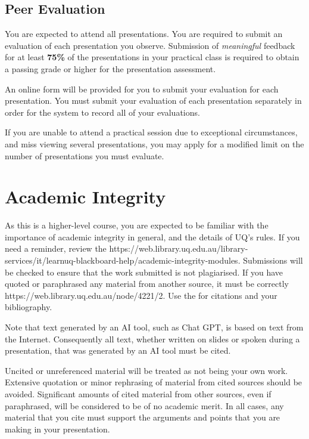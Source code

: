 \documentclass{csse4400}
\begin{document}
\subsection{Peer Evaluation}
You are expected to attend all presentations.
You are required to submit an evaluation of each presentation you observe.
Submission of \emph{meaningful} feedback for at least \textbf{75\%} of the presentations in your practical class
is required to obtain a passing grade or higher for the presentation assessment.

An online form will be provided for you to submit your evaluation for each presentation.
You must submit your evaluation of each presentation separately in order for the system to record all of your evaluations.

If you are unable to attend a practical session due to exceptional circumstances,
and miss viewing several presentations,
you may apply for a modified limit on the number of presentations you must evaluate.


\section{Academic Integrity}
As this is a higher-level course, you are expected to be familiar with the importance of academic integrity in general,
and the details of UQ's rules.
If you need a reminder, review the 
{https://web.library.uq.edu.au/library-services/it/learnuq-blackboard-help/academic-integrity-modules}.
Submissions will be checked to ensure that the work submitted is not plagiarised.
If you have quoted or paraphrased any material from another source, it must be correctly 
{https://web.library.uq.edu.au/node/4221/2}.
Use the  for citations and your bibliography.

Note that text generated by an AI tool, such as Chat GPT, is based on text from the Internet.
Consequently all text, whether written on slides or spoken during a presentation,
that was generated by an AI tool must be cited.

Uncited or unreferenced material will be treated as not being your own work.
Extensive quotation or minor rephrasing of material from cited sources should be avoided.
Significant amounts of cited material from other sources, even if paraphrased, will be considered to be of no academic merit.
In all cases, any material that you cite must support the arguments and points that you are making in your presentation.
\end{document}
